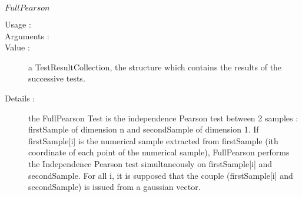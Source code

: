\begin{description}
\begin{description}
  \item $FullPearson$
    \begin{description}
    \item[Usage :] \rule{0pt}{1em}
    \item[Arguments :] \rule{0pt}{1em}
    \item[Value :]  a TestResultCollection, the structure which contains the results of the successive tests.
    \item[Details :] the FullPearson Test is the independence Pearson test between 2 samples : firstSample of dimension n and secondSample of dimension 1. If firstSample[i] is the numerical sample extracted from firstSample (ith coordinate of each point of the numerical sample), FullPearson performs the Independence Pearson test simultaneously on firstSample[i] and secondSample. For all i, it is supposed that the couple (firstSample[i] and secondSample) is issued from a gaussian  vector.
    \end{description}
    \bigskip


\end{description}
\end{description}
